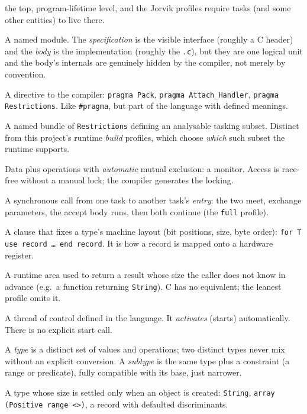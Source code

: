 \begin{description}[style=nextline]
  the top, program-lifetime level, and the Jorvik profiles require tasks (and
  some other entities) to live there.
\item[Package (specification / body).] A named module. The \emph{specification}
  is the visible interface (roughly a C header) and the \emph{body} is the
  implementation (roughly the \texttt{.c}), but they are one logical unit and
  the body's internals are genuinely hidden by the compiler, not merely by
  convention.
\item[Pragma.] A directive to the compiler: \texttt{pragma Pack},
  \texttt{pragma Attach\_Handler}, \texttt{pragma Restrictions}. Like
  \texttt{\#pragma}, but part of the language with defined meanings.
\item[Profile (Ravenscar / Jorvik).] A named bundle of \texttt{Restrictions}
  defining an analysable tasking subset. Distinct from this project's runtime
  \emph{build} profiles, which choose \emph{which} such subset the runtime
  supports.
\item[Protected object.] Data plus operations with \emph{automatic} mutual
  exclusion: a monitor. Access is race-free without a manual lock; the compiler
  generates the locking.
\item[Rendezvous.] A synchronous call from one task to another task's
  \emph{entry}: the two meet, exchange parameters, the accept body runs, then both
  continue (the \texttt{full} profile).
\item[Representation clause.] A clause that fixes a type's machine layout (bit
  positions, size, byte order): \texttt{for T use record \ldots\ end record}. It is
  how a record is mapped onto a hardware register.
\item[Secondary stack.] A runtime area used to return a result whose size the
  caller does not know in advance (e.g.\ a function returning \texttt{String}). C
  has no equivalent; the leanest profile omits it.
\item[Task.] A thread of control defined in the language. It \emph{activates}
  (starts) automatically. There is no explicit start call.
\item[Type vs.\ subtype.] A \emph{type} is a distinct set of values and
  operations; two distinct types never mix without an explicit conversion. A
  \emph{subtype} is the same type plus a constraint (a range or predicate),
  fully compatible with its base, just narrower.
\item[Unconstrained type.] A type whose size is settled only when an object is
  created: \texttt{String}, \texttt{array (Positive range <>)}, a record with
  defaulted discriminants.
\end{description}

